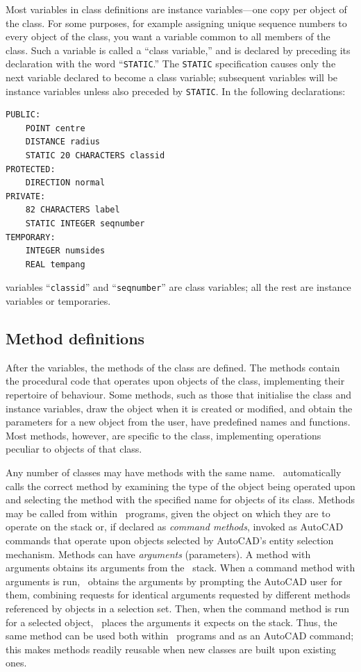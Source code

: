 \documentclass{article}
\begin{document}
Most variables in class definitions are instance variables---one copy
per object of the class.  For some purposes, for example assigning
unique sequence numbers to every object of the class, you want a
variable common to all members of the class.  Such a variable
is called a ``class variable,'' and is declared by preceding its
declaration with the word ``{\tt STATIC}\@.''  The {\tt STATIC}
specification causes only the next variable declared to become a class
variable; subsequent variables will be instance variables unless
also preceded by {\tt STATIC}\@.  In the following declarations:

\begin{verbatim}
PUBLIC:
    POINT centre
    DISTANCE radius
    STATIC 20 CHARACTERS classid
PROTECTED:
    DIRECTION normal
PRIVATE:
    82 CHARACTERS label
    STATIC INTEGER seqnumber
TEMPORARY:
    INTEGER numsides
    REAL tempang
\end{verbatim}

variables ``{\tt classid}'' and ``{\tt seqnumber}'' are class
variables; all the rest are instance variables or temporaries.

\subsection{Method definitions}

After the variables, the methods of the class are
defined.  The methods contain the procedural code that operates upon
objects of the class, implementing their repertoire of behaviour.
Some methods, such as those that initialise the class and instance
variables, draw the object when it is created or modified, and obtain
the parameters for a new object from the user, have predefined names
and functions.  Most methods, however, are specific to the class,
implementing operations peculiar to objects of that class.

Any number of classes may have methods with the same name.  \cw\
automatically calls the correct method by examining the type of the
object being operated upon and selecting the method with the specified
name for objects of its class.  Methods may be called from
within \cw\ programs, given the object on which they are to operate
on the stack or, if declared as {\em command methods}, invoked as
AutoCAD commands that operate upon objects selected by AutoCAD's
entity selection mechanism.  Methods can have {\em arguments}
(parameters).  A method with arguments obtains its arguments from the
\atlas\ stack.  When a command method with arguments is run, \cw\
obtains the arguments by prompting the AutoCAD user for them,
combining requests for identical arguments requested by different
methods referenced by objects in a selection set.  Then, when the
command method is run for a selected object, \cw\ places the arguments
it expects on the stack.  Thus, the same method can be used both
within \cw\ programs and as an AutoCAD command; this makes methods
readily reusable when new classes are built upon existing ones.
\end{document}
